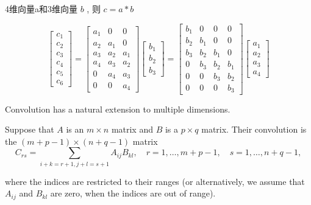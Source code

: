 \begin{example}
    4维向量a和3维向量 $ b $ ,  则 $ c=a * b $

$$
\left[\begin{array}{l}
c_{1} \\
c_{2} \\
c_{3} \\
c_{4} \\
c_{5} \\
c_{6}
\end{array}\right]=\left[\begin{array}{lll}
a_{1} & 0 & 0 \\
a_{2} & a_{1} & 0 \\
a_{3} & a_{2} & a_{1} \\
a_{4} & a_{3} & a_{2} \\
0 & a_{4} & a_{3} \\
0 & 0 & a_{4}
\end{array}\right]\left[\begin{array}{l}
b_{1} \\
b_{2} \\
b_{3}
\end{array}\right]=\left[\begin{array}{cccc}
b_{1} & 0 & 0 & 0 \\
b_{2} & b_{1} & 0 & 0 \\
b_{3} & b_{2} & b_{1} & 0 \\
0 & b_{3} & b_{2} & b_{1} \\
0 & 0 & b_{3} & b_{2} \\
0 & 0 & 0 & b_{3}
\end{array}\right]\left[\begin{array}{l}
a_{1} \\
a_{2} \\
a_{3} \\
a_{4}
\end{array}\right]
$$
\end{example}

Convolution has a natural extension to multiple dimensions.

\begin{definition}[2-D convolution]
     Suppose that $ A $ is an $ m \times n $ matrix and $ B $ is a $ p \times q $ matrix. Their convolution is the $ (m+p-1) \times(n+q-1) $ matrix
$$
C_{r s}=\sum_{i+k=r+1, j+l=s+1} A_{i j} B_{k l}, \quad r=1, \ldots, m+p-1, \quad s=1, \ldots, n+q-1,
$$

where the indices are restricted to their ranges (or alternatively, we assume that $ A_{i j} $ and $ B_{k l} $ are zero, when the indices are out of range). 
\end{definition}


